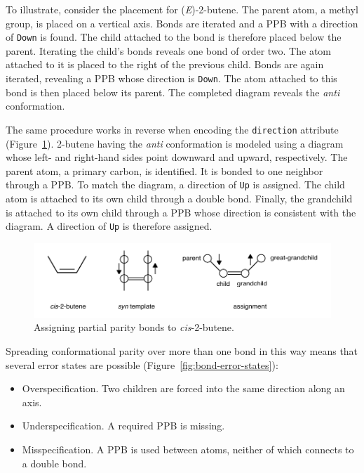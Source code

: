 \documentclass{article}
\def\ttt{\texttt}
\begin{document}
To illustrate, consider the placement for (\textit{E})-2-butene. The parent atom, a methyl group, is placed on a vertical axis. Bonds are iterated and a PPB with a direction of \ttt{Down} is found. The child attached to the bond is therefore placed below the parent. Iterating the child's bonds reveals one bond of order two. The atom attached to it is placed to the right of the previous child. Bonds are again iterated, revealing a PPB whose direction is \ttt{Down}. The atom attached to this bond is then placed below its parent. The completed diagram reveals the \textit{anti} conformation.

The same procedure works in reverse when encoding the \ttt{direction} attribute (Figure~\ref{fig:assigning-ppb}). 2-butene having the \textit{anti} conformation is modeled using a diagram whose left- and right-hand sides point downward and upward, respectively. The parent atom, a primary carbon, is identified. It is bonded to one neighbor through a PPB. To match the diagram, a direction of \ttt{Up} is assigned. The child atom is attached to its own child through a double bond. Finally, the grandchild is attached to its own child through a PPB whose direction is consistent with the diagram. A direction of \ttt{Up} is therefore assigned.

\begin{figure}
    \centering
    \includegraphics[width=\columnwidth]{assigning-ppbs.pdf}
    \caption{Assigning partial parity bonds to \textit{cis}-2-butene.}
    \label{fig:assigning-ppb}
\end{figure}

Spreading conformational parity over more than one bond in this way means that several error states are possible (Figure~\ref{fig:bond-error-states}):

\begin{itemize}
    \item{Overspecification. Two children are forced into the same direction along an axis.}
    \item{Underspecification. A required PPB is missing.}
    \item{ Misspecification. A PPB is used between atoms, neither of which connects to a double bond.}
\end{itemize}
\end{document}
